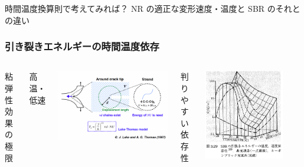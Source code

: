 \documentclass[11pt, dvipdfmx]{beamer}
\begin{document}
\begin{frame}
\begin{columns}[totalwidth=1\textwidth]
\end{columns}

\begin{alertblock}{時間温度換算則で考えてみれば？}
NR の適正な変形速度・温度と SBR のそれとの違い
\end{alertblock}

\end{frame}


\begin{frame}
\frametitle{引き裂きエネルギーの時間温度依存}

%

\begin{columns}[totalwidth=1\textwidth]

粘弾性効果の極限

高温・低速

\includegraphics[width=\textwidth]{./fig/Lake_Thomas.png}


判りやすい依存性

\includegraphics[width=0.8\textwidth]{./fig/break_TT.png}


\end{columns}
\end{frame}
\end{document}
